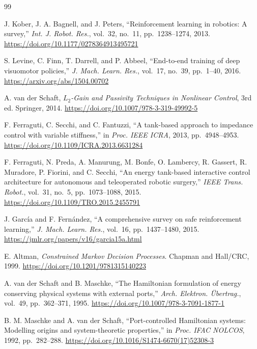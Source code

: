 \documentclass[11pt]{article}
\begin{document}

\begin{thebibliography}{99}

J. Kober, J. A. Bagnell, and J. Peters,
``Reinforcement learning in robotics: A survey,''
\emph{Int. J. Robot. Res.}, vol.~32, no.~11, pp.~1238--1274, 2013.
\url{https://doi.org/10.1177/0278364913495721}

S. Levine, C. Finn, T. Darrell, and P. Abbeel,
``End-to-end training of deep visuomotor policies,''
\emph{J. Mach. Learn. Res.}, vol.~17, no.~39, pp.~1--40, 2016.
\url{https://arxiv.org/abs/1504.00702}

A. van der Schaft,
\emph{$L_2$-Gain and Passivity Techniques in Nonlinear Control}, 3rd ed.
Springer, 2014.
\url{https://doi.org/10.1007/978-3-319-49992-5}

F. Ferraguti, C. Secchi, and C. Fantuzzi,
``A tank-based approach to impedance control with variable stiffness,''
in \emph{Proc. IEEE ICRA}, 2013, pp.~4948--4953.
\url{https://doi.org/10.1109/ICRA.2013.6631284}

F. Ferraguti, N. Preda, A. Manurung, M. Bonfe, O. Lambercy, R. Gassert,
R. Muradore, P. Fiorini, and C. Secchi,
``An energy tank-based interactive control architecture for autonomous and
teleoperated robotic surgery,''
\emph{IEEE Trans. Robot.}, vol.~31, no.~5, pp.~1073--1088, 2015.
\url{https://doi.org/10.1109/TRO.2015.2455791}

J. Garc\'{i}a and F. Fern\'{a}ndez,
``A comprehensive survey on safe reinforcement learning,''
\emph{J. Mach. Learn. Res.}, vol.~16, pp.~1437--1480, 2015.
\url{https://jmlr.org/papers/v16/garcia15a.html}

E. Altman,
\emph{Constrained Markov Decision Processes}.
Chapman and Hall/CRC, 1999.
\url{https://doi.org/10.1201/9781315140223}

A. van der Schaft and B. Maschke,
``The Hamiltonian formulation of energy conserving physical systems with
external ports,''
\emph{Arch. Elektron. \"{U}bertrag.}, vol.~49, pp.~362--371, 1995.
\url{https://doi.org/10.1007/978-3-7091-1877-1}

B. M. Maschke and A. van der Schaft,
``Port-controlled Hamiltonian systems: Modelling origins and system-theoretic
properties,''
in \emph{Proc. IFAC NOLCOS}, 1992, pp.~282--288.
\url{https://doi.org/10.1016/S1474-6670(17)52308-3}


\end{thebibliography}
\end{document}
